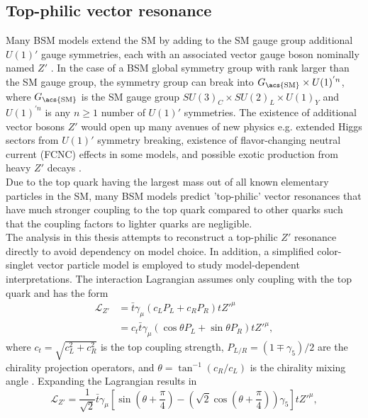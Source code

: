 \documentclass[../thesis.tex]{subfiles}
\begin{document}
\subsection{Top-philic vector resonance}
\label{sec:ttZp}
Many BSM models extend the \acs{SM} by adding to the \acs{SM} gauge group additional $U(1)'$ gauge symmetries, each with an associated vector gauge boson nominally named $Z'$ \citep{theory:Zp}. In the case of a \acs{BSM} global symmetry group with rank larger than the \acs{SM} gauge group, the symmetry group can break into $G_\text{\acs{SM}}\times U(1)^{'n}$, where $G_\text{\acs{SM}}$ is the \acs{SM} gauge group $SU(3)_C \times SU(2)_L \times U(1)_Y$ and $U(1)^{'n}$ is any $n\geq 1$ number of $U(1)'$ symmetries. The existence of additional vector bosons $Z'$ would open up many avenues of new physics e.g. extended Higgs sectors from $U(1)'$ symmetry breaking, existence of flavor-changing neutral current (FCNC) effects in some models, and possible exotic production from heavy $Z'$ decays \citep{theory:Zp}.\\
Due to the top quark having the largest mass out of all known elementary particles in the \acs{SM}, many \acs{BSM} models \citep{Ferretti:2013kya,Vecchi:2015fma,Agashe:2003zs,Agashe:2004rs} predict 'top-philic' vector resonances that have much stronger coupling to the top quark compared to other quarks such that the coupling factors to lighter quarks are negligible.\\
The analysis in this thesis attempts to reconstruct a top-philic $Z'$ resonance directly to avoid dependency on model choice. In addition, a simplified color-singlet vector particle model \citep{theory:ttZp,theory:ttZp_LHC} is employed to study model-dependent interpretations. The interaction Lagrangian assumes only coupling with the top quark and has the form
\begin{equation}
\begin{aligned}
\mathcal{L}_{Z'} &= \bar{t}\gamma_\mu\left(c_L P_L + c_R P_R\right) tZ'^{\mu}\\
&= c_t \bar{t}\gamma_\mu\left(\cos\theta P_L + \sin\theta P_R\right) tZ'^{\mu},
\end{aligned}
\end{equation}
where $c_t=\sqrt{c_L^2+c_R^2}$ is the top coupling strength, $P_{L/R}=(1\mp \gamma_5)/2$ are the chirality projection operators, and $\theta = \tan^{-1}(c_R/c_L)$ is the chirality mixing angle \citep{theory:ttZp}. Expanding the Lagrangian results in
\begin{equation}
\mathcal{L}_{Z'} = \frac{1}{\sqrt{2}}\bar{t}\gamma_\mu\left[
\sin\left(\theta+\frac{\pi}{4}\right) - \left(\sqrt{2}\cos\left(\theta+\frac{\pi}{4}\right)\right)\gamma_5
\right] tZ'^{\mu},
\end{equation}
\end{document}
